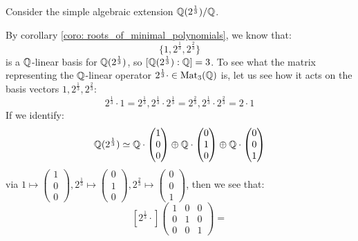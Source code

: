         \begin{example}
            Consider the simple algebraic extension $\mathbb{Q}(2^{\frac13})/\mathbb{Q}$.
            
            By corollary \ref{coro: roots_of_minimal_polynomials}, we know that:
                $$\{1, 2^{\frac13}, 2^{\frac23}\}$$
            is a $\mathbb{Q}$-linear basis for $\mathbb{Q}(2^{\frac13})$, so $[\mathbb{Q}(2^{\frac13}) : \mathbb{Q}] = 3$. To see what the matrix representing the $\mathbb{Q}$-linear operator $2^{\frac13} \cdot \in \mathrm{Mat}_3(\mathbb{Q})$ is, let us see how it acts on the basis vectors $1, 2^{\frac13}, 2^{\frac23}$:
                $$2^{\frac13} \cdot 1 = 2^{\frac13}, 2^{\frac13} \cdot 2^{\frac13} = 2^{\frac23}, 2^{\frac13} \cdot 2^{\frac23} = 2 \cdot 1$$
            If we identify:
                $$\mathbb{Q}(2^{\frac13}) \simeq \mathbb{Q} \cdot \begin{pmatrix} 1 \\ 0 \\ 0 \end{pmatrix} \oplus \mathbb{Q} \cdot \begin{pmatrix} 0 \\ 1 \\ 0 \end{pmatrix} \oplus \mathbb{Q} \cdot \begin{pmatrix} 0 \\ 0 \\ 1 \end{pmatrix}$$
            via $1 \mapsto \begin{pmatrix} 1 \\ 0 \\ 0 \end{pmatrix}, 2^{\frac13} \mapsto \begin{pmatrix} 0 \\ 1 \\ 0 \end{pmatrix}, 2^{\frac23} \mapsto \begin{pmatrix} 0 \\ 0 \\ 1 \end{pmatrix}$, then we see that:
                $$
                    [2^{\frac13} \cdot]
                    \begin{pmatrix}
                        1 & 0 & 0
                        \\
                        0 & 1 & 0
                        \\
                        0 & 0 & 1
                    \end{pmatrix}
                    =
$$
\end{example}
